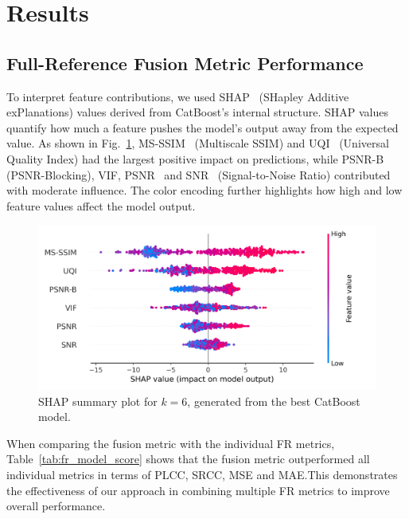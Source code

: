 \section{Results}

\subsection{Full-Reference Fusion Metric Performance}


To interpret feature contributions, we used SHAP~\cite{shap} (SHapley Additive exPlanations) values derived from CatBoost's internal structure. SHAP values quantify how much a feature pushes the model's output away from the expected value. As shown in Fig.~\ref{fig:shap_summary}, MS-SSIM~\cite{wang2003multiscale} (Multiscale SSIM) and UQI~\cite{wang2004ssim} (Universal Quality Index) had the largest positive impact on predictions, while PSNR-B~\cite{ma2011psnr} (PSNR-Blocking), VIF\cite{sheikh2006image}, PSNR~\cite{pnsr2003} and SNR~\cite{gonzalez2002digital} (Signal-to-Noise Ratio) contributed with moderate influence. The color encoding further highlights how high and low feature values affect the model output.

\begin{figure}
    \centering
    \includegraphics[width=0.7\linewidth]{images/shap_summary.png}
    \caption{SHAP summary plot for $k=6$, generated from the best CatBoost model.}\label{fig:shap_summary}
\end{figure}

When comparing the fusion metric with the individual FR metrics, Table~\ref{tab:fr_model_score} shows that the fusion metric outperformed all individual metrics in terms of PLCC, SRCC, MSE and MAE.\@ This demonstrates the effectiveness of our approach in combining multiple FR metrics to improve overall performance.

